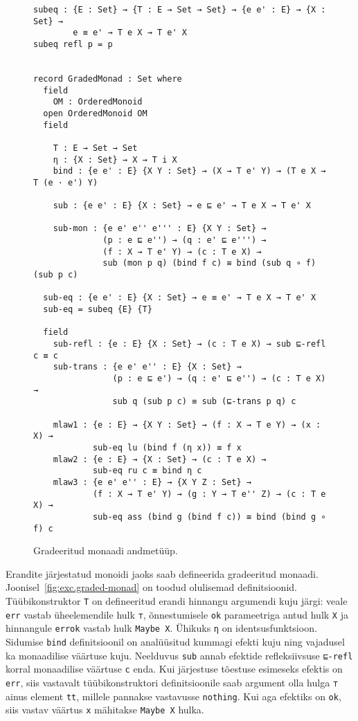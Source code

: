 \documentclass[a4paper,12pt]{article}
\begin{document}
\begin{figure}
  \begin{BVerbatim}
subeq : {E : Set} → {T : E → Set → Set} → {e e' : E} → {X : Set} →
        e ≡ e' → T e X → T e' X
subeq refl p = p


record GradedMonad : Set where
  field
    OM : OrderedMonoid
  open OrderedMonoid OM
  field

    T : E → Set → Set
    η : {X : Set} → X → T i X
    bind : {e e' : E} {X Y : Set} → (X → T e' Y) → (T e X → T (e · e') Y)

    sub : {e e' : E} {X : Set} → e ⊑ e' → T e X → T e' X

    sub-mon : {e e' e'' e''' : E} {X Y : Set} →
              (p : e ⊑ e'') → (q : e' ⊑ e''') → 
              (f : X → T e' Y) → (c : T e X) → 
              sub (mon p q) (bind f c) ≡ bind (sub q ∘ f) (sub p c) 

  sub-eq : {e e' : E} {X : Set} → e ≡ e' → T e X → T e' X
  sub-eq = subeq {E} {T}
 
  field
    sub-refl : {e : E} {X : Set} → (c : T e X) → sub ⊑-refl c ≡ c
    sub-trans : {e e' e'' : E} {X : Set} →
                (p : e ⊑ e') → (q : e' ⊑ e'') → (c : T e X) → 
                sub q (sub p c) ≡ sub (⊑-trans p q) c   

    mlaw1 : {e : E} → {X Y : Set} → (f : X → T e Y) → (x : X) →
            sub-eq lu (bind f (η x)) ≡ f x
    mlaw2 : {e : E} → {X : Set} → (c : T e X) →
            sub-eq ru c ≡ bind η c
    mlaw3 : {e e' e'' : E} → {X Y Z : Set} →
            (f : X → T e' Y) → (g : Y → T e'' Z) → (c : T e X) → 
            sub-eq ass (bind g (bind f c)) ≡ bind (bind g ∘ f) c 
  \end{BVerbatim}
  \caption{Gradeeritud monaadi andmetüüp.}
  \label{fig:graded-monad}
\end{figure}

Erandite järjestatud monoidi jaoks saab defineerida gradeeritud monaadi. Joonisel~\ref{fig:exc.graded-monad} on toodud olulisemad definitsioonid.
Tüübikonstruktor {\tt T} on defineeritud erandi hinnangu argumendi kuju järgi: veale {\tt err} vastab üheelemendile hulk {\tt ⊤}, õnnestumisele {\tt ok} parameetriga antud hulk {\tt X} ja hinnangule {\tt errok} vastab hulk {\tt Maybe X}.
Ühikuks {\tt η} on identsusfunktsioon.
Sidumise {\tt bind} definitsioonil on analüüsitud kummagi efekti kuju ning vajadusel ka monaadilise väärtuse kuju.
Neelduvus {\tt sub} annab efektide refleksiivsuse {\tt ⊑-refl} korral monaadilise väärtuse {\tt c} enda.
Kui järjestuse tõestuse esimeseks efektis on {\tt err}, siis vastavalt tüübikonstruktori definitsioonile saab argument olla hulga {\tt ⊤} ainus element {\tt tt}, millele pannakse vastavusse {\tt nothing}.
Kui aga efektiks on {\tt ok}, siis vastav väärtus {\tt x} mähitakse {\tt Maybe X} hulka.
\end{document}
